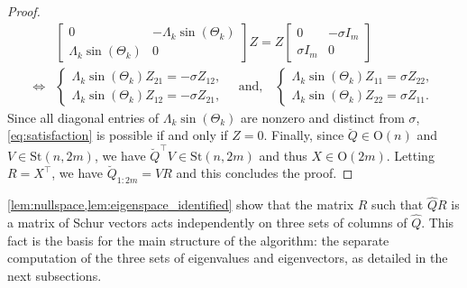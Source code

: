 \documentclass[10pt,twoside,dvipsnames]{siamart1116}
\numberwithin{algorithm}{section}
\numberwithin{equation}{section}
\begin{document}
\begin{proof}
	 \begin{align}
	 \nonumber
	 &\begin{bmatrix}
	 0&-\Lambda_k\sin(\Theta_k)\\
	 \Lambda_k\sin(\Theta_k)&0
	 \end{bmatrix} Z = Z \begin{bmatrix}
	0&-\sigma I_m\\
	\sigma I_m&0
	\end{bmatrix}\\
	\label{eq:satisfaction}
	\iff& \begin{cases}
	\Lambda_k\sin(\Theta_k)Z_{21} = -\sigma Z_{12},\\ \Lambda_k\sin(\Theta_k)Z_{12} = -\sigma Z_{21},
	\end{cases}\quad\text{and,}\quad
	\begin{cases}
	\Lambda_k\sin(\Theta_k)Z_{11} = \sigma Z_{22},\\ \Lambda_k\sin(\Theta_k)Z_{22} = \sigma Z_{11}.
	\end{cases}
	 \end{align}
	 Since all diagonal entries of $\Lambda_k\sin(\Theta_k)$ are nonzero and distinct from $\sigma$, \eqref{eq:satisfaction} is possible if and only if $Z=0$. Finally, since $\breve{Q}\in\mathrm{O}(n)$ and $V\in\mathrm{St}(n,2m)$, we have $\breve{Q}^\top V\in\mathrm{St}(n,2m)$ and thus $X\in\mathrm{O}(2m)$. Letting $R = X^\top $, we have $\breve{Q}_{1:2m} = VR$ and this concludes the proof.
	\end{proof}
\cref{lem:nullspace,lem:eigenspace_identified} show that the matrix $R$ such that $\widehat{Q}R$ is a matrix of Schur vectors acts independently on three sets of columns of $\widehat{Q}$. This fact is the basis for the main structure of the algorithm: the separate computation of the three sets of eigenvalues and eigenvectors, as detailed in the next subsections.
	
\end{document}

